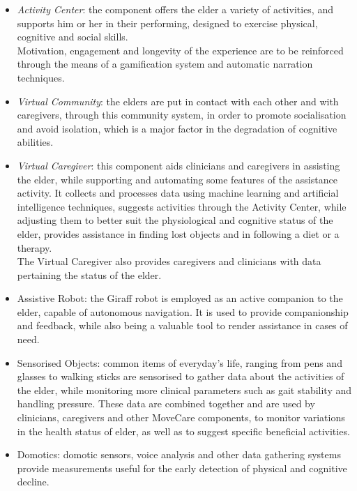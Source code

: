 \documentclass[12pt,a4paper,oneside]{report}
\begin{document}
\begin{itemize}\setlength{\itemsep}{8pt}
\item \textit{Activity Center}: the component offers the elder a variety of activities, and supports him or her in their performing, designed to exercise physical, cognitive and social skills.\\
Motivation, engagement and longevity of the experience are to be reinforced through the means of a gamification system and automatic narration techniques.
\item \textit{Virtual Community}: the elders are put in contact with each other and with caregivers, through this community system, in order to promote socialisation and avoid isolation, which is a major factor in the degradation of cognitive abilities.
\item \textit{Virtual Caregiver}: this component aids clinicians and caregivers in assisting the elder, while supporting and automating some features of the assistance activity. It collects and processes data using machine learning and artificial intelligence techniques, suggests activities through the Activity Center, while adjusting them to better suit the physiological and cognitive status of the elder, provides assistance in finding lost objects and in following a diet or a therapy.\\
The Virtual Caregiver also provides caregivers and clinicians with data pertaining the status of the elder.
\item Assistive Robot: the Giraff \cite{giraff} robot is employed as an active companion to the elder, capable of autonomous navigation. It is used to provide companionship and feedback, while also being a valuable tool to render assistance in cases of need.
\item Sensorised Objects: common items of everyday's life, ranging from pens and glasses to walking sticks are sensorised to gather data about the activities of the elder, while monitoring more clinical parameters such as gait stability and handling pressure. These data are combined together and are used by clinicians, caregivers and other MoveCare components, to monitor variations in the health status of elder, as well as to suggest specific beneficial activities.
\item Domotics: domotic sensors, voice analysis and other data gathering systems provide measurements useful for the early detection of physical and cognitive decline. 
\end{itemize}
\end{document}
